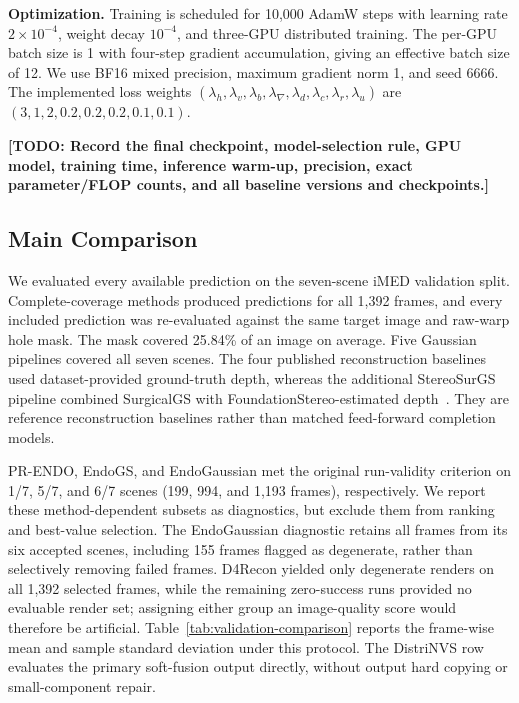 \documentclass[letterpaper,10pt,conference]{ieeeconf}
\newcommand{\todo}[1]{\textcolor{todoRed}{\textbf{[TODO: #1]}}}
\begin{document}
\noindent\textbf{Optimization.}
Training is scheduled for 10,000 AdamW steps with learning rate
$2\times10^{-4}$, weight decay $10^{-4}$, and three-GPU distributed training.
The per-GPU batch size is 1 with four-step gradient accumulation, giving an
effective batch size of 12. We use BF16 mixed precision, maximum gradient norm
1, and seed 6666. The implemented loss weights
$(\lambda_h,\lambda_v,\lambda_b,\lambda_\nabla,\lambda_d,\lambda_c,
\lambda_r,\lambda_u)$ are $(3,1,2,0.2,0.2,0.2,0.1,0.1)$.

\todo{Record the final checkpoint, model-selection rule, GPU model, training
time, inference warm-up, precision, exact parameter/FLOP counts, and all
baseline versions and checkpoints.}

\subsection{Main Comparison}

We evaluated every available prediction on the seven-scene iMED validation
split. Complete-coverage methods produced predictions for all 1,392 frames,
and every included prediction was re-evaluated against the same target image
and raw-warp hole mask. The mask covered 25.84\% of an image on average.
Five Gaussian pipelines covered all seven scenes. The four published
reconstruction baselines used dataset-provided ground-truth depth, whereas the
additional StereoSurGS pipeline combined SurgicalGS with
FoundationStereo-estimated depth~\cite{chen2025surgicalgs,wen2025foundationstereo}.
They are reference reconstruction baselines rather than matched feed-forward
completion models.

PR-ENDO, EndoGS, and EndoGaussian met the original run-validity criterion on
1/7, 5/7, and 6/7 scenes (199, 994, and 1,193 frames), respectively. We report
these method-dependent subsets as diagnostics, but exclude them from ranking
and best-value selection. The EndoGaussian diagnostic retains all frames from
its six accepted scenes, including 155 frames flagged as degenerate, rather
than selectively removing failed frames. D4Recon yielded only degenerate
renders on all 1,392 selected frames, while the remaining zero-success runs
provided no evaluable render set; assigning either group an image-quality
score would therefore be artificial. Table~\ref{tab:validation-comparison}
reports the frame-wise mean and sample standard deviation under this protocol.
The DistriNVS row evaluates the primary soft-fusion output directly, without
output hard copying or small-component repair.
\end{document}

